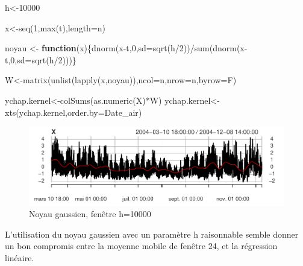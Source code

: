\documentclass[
]{article}
\newenvironment{Shaded}{\begin{snugshade}}{\end{snugshade}}
\newcommand{\AttributeTok}[1]{\textcolor[rgb]{0.77,0.63,0.00}{#1}}
\newcommand{\ControlFlowTok}[1]{\textcolor[rgb]{0.13,0.29,0.53}{\textbf{#1}}}
\newcommand{\DecValTok}[1]{\textcolor[rgb]{0.00,0.00,0.81}{#1}}
\newcommand{\FunctionTok}[1]{\textcolor[rgb]{0.00,0.00,0.00}{#1}}
\newcommand{\NormalTok}[1]{#1}
\newcommand{\OtherTok}[1]{\textcolor[rgb]{0.56,0.35,0.01}{#1}}
\newcommand{\SpecialCharTok}[1]{\textcolor[rgb]{0.00,0.00,0.00}{#1}}
\begin{document}
\begin{Shaded}
\begin{Highlighting}[]
\NormalTok{h}\OtherTok{\textless{}{-}}\DecValTok{10000}

\NormalTok{x}\OtherTok{\textless{}{-}}\FunctionTok{seq}\NormalTok{(}\DecValTok{1}\NormalTok{,}\FunctionTok{max}\NormalTok{(t),}\AttributeTok{length=}\NormalTok{n)}

\NormalTok{noyau }\OtherTok{\textless{}{-}} \ControlFlowTok{function}\NormalTok{(x)\{}\FunctionTok{dnorm}\NormalTok{(x}\SpecialCharTok{{-}}\NormalTok{t,}\DecValTok{0}\NormalTok{,}\AttributeTok{sd=}\FunctionTok{sqrt}\NormalTok{(h}\SpecialCharTok{/}\DecValTok{2}\NormalTok{))}\SpecialCharTok{/}\FunctionTok{sum}\NormalTok{(}\FunctionTok{dnorm}\NormalTok{(x}\SpecialCharTok{{-}}\NormalTok{t,}\DecValTok{0}\NormalTok{,}\AttributeTok{sd=}\FunctionTok{sqrt}\NormalTok{(h}\SpecialCharTok{/}\DecValTok{2}\NormalTok{)))\}}

\NormalTok{W}\OtherTok{\textless{}{-}}\FunctionTok{matrix}\NormalTok{(}\FunctionTok{unlist}\NormalTok{(}\FunctionTok{lapply}\NormalTok{(x,noyau)),}\AttributeTok{ncol=}\NormalTok{n,}\AttributeTok{nrow=}\NormalTok{n,}\AttributeTok{byrow=}\NormalTok{F)}

\NormalTok{ychap.kernel}\OtherTok{\textless{}{-}}\FunctionTok{colSums}\NormalTok{(}\FunctionTok{as.numeric}\NormalTok{(X)}\SpecialCharTok{*}\NormalTok{W)}
\NormalTok{ychap.kernel}\OtherTok{\textless{}{-}}\FunctionTok{xts}\NormalTok{(ychap.kernel,}\AttributeTok{order.by=}\NormalTok{Date\_air)}
\end{Highlighting}
\end{Shaded}

\begin{figure}

{\centering \includegraphics{STA202_report_files/figure-latex/kernel-1} 

}

\caption{\label{fig:kernel} Noyau gaussien, fenêtre h=10000}\label{fig:kernel}
\end{figure}

L'utilisation du noyau gaussien avec un paramètre h raisonnable semble
donner un bon compromis entre la moyenne mobile de fenêtre 24, et la
régression linéaire.
\end{document}
